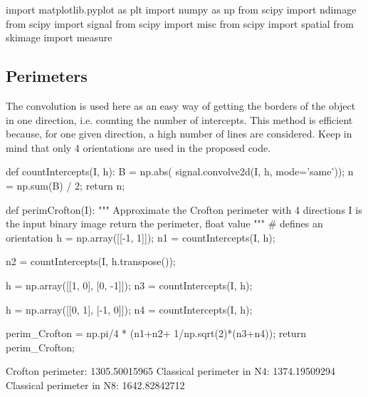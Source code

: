 \def\QRCODE{TB_image_TUT.IMG.image_characterization_pythonqrcode.png}
\def\QRPAGE{http://www.iptutorials.science/tree/master/TB_image/TUT.IMG.image_characterization/python}

\begin{python}
import matplotlib.pyplot as plt
import numpy as np
from scipy import ndimage
from scipy import signal
from scipy import misc
from scipy import spatial
from skimage import measure
\end{python}


\subsection{Perimeters}
The convolution is used here as an easy way of getting the borders of the object in one direction, i.e. counting the number of intercepts. This method is efficient because, for one given direction, a high number of lines are considered. Keep in mind that only 4 orientations are used in the proposed code.

\begin{python}
def countIntercepts(I, h):
    B = np.abs( signal.convolve2d(I, h, mode='same'));
    n = np.sum(B) / 2;
    return n;

def perimCrofton(I):
    """
    Approximate the Crofton perimeter with 4 directions
    I is the input binary image
    return the perimeter, float value
    """
    # defines an orientation
    h = np.array([[-1, 1]]);
    n1 = countIntercepts(I, h);
    
    n2 = countIntercepts(I, h.transpose());
    
    h = np.array([[1, 0], [0, -1]]);
    n3 = countIntercepts(I, h);
    
    h = np.array([[0, 1], [-1, 0]]);
    n4 = countIntercepts(I, h);
    
    perim_Crofton = np.pi/4 * (n1+n2+ 1/np.sqrt(2)*(n3+n4));
    return perim_Crofton;
\end{python}

\begin{sh}
Crofton perimeter:  1305.50015965
Classical perimeter in N4:  1374.19509294
Classical perimeter in N8:  1642.82842712
\end{sh}

